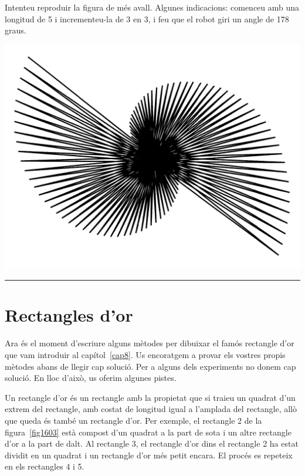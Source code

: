 \begin{center}
\colorbox{black}{}
\end{center}
{\small
\noindent
Intenteu reproduir la figura de més avall. Algunes indicacions: comenceu amb una longitud de 5 i incrementeu-la de 3 en 3, i feu que el robot giri un angle de 178 graus.}
\begin{center}
\includegraphics[scale=0.075]{Imatges/figuraE16-9.jpg} 
\end{center}
\noindent
\rule{\textwidth}{3pt}

\section{Rectangles d'or}
Ara és el moment d'escriure alguns mètodes per dibuixar el famós rectangle d'or que vam introduir al capítol~\ref{cap8}. Us encoratgem a provar els vostres propis mètodes abans de llegir cap solució. Per a alguns dels experiments no donem cap solució. En lloc d'això, us oferim algunes pistes.

Un rectangle d'or és un rectangle amb la propietat que si traieu un quadrat d'un extrem del rectangle, amb costat de longitud igual a l'amplada del rectangle, allò que queda és també un rectangle d'or. Per exemple, el rectangle 2 de la figura~\ref{fig1603} està compost d'un quadrat a la part de sota i un altre rectangle d'or a la part de dalt. Al rectangle 3, el rectangle d'or dins el rectangle 2 ha estat dividit en un quadrat i un rectangle d'or més petit encara. El procés es repeteix en els rectangles 4 i 5.

